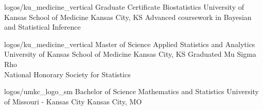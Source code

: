 
\EducationExtraNoDate
{logos/ku_medicine_vertical}
{Graduate Certificate}
{Biostatistics}
{University of Kansas School of Medicine}
{Kansas City, KS}
{Advanced coursework in Bayesian and Statistical Inference}

\vspace*{0.01 in}

\EducationExtraNoDate
{logos/ku_medicine_vertical}
{Master of Science}
{Applied Statistics and Analytics}
{University of Kansas School of Medicine}
{Kansas City, KS}
{Graduated Mu Sigma Rho\\ National Honorary Society for
Statistics}

\vspace*{0.01 in}

\EducationNoDate
{logos/umkc_logo_sm}
{Bachelor of Science}
{Mathematics and Statistics}
{University of Missouri - Kansas City}
{Kansas City, MO}